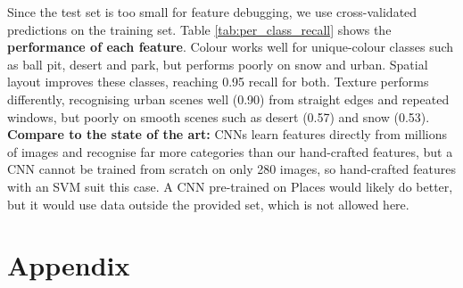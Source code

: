 \documentclass[12pt]{article}
\begin{document}
\noindent
Since the test set is too small for feature debugging, we use cross-validated predictions on the training set. Table \ref{tab:per_class_recall} shows the \textbf{performance of each feature}. Colour works well for unique-colour classes such as ball pit, desert and park, but performs poorly on snow and urban. Spatial layout improves these classes, reaching 0.95 recall for both. Texture performs differently, recognising urban scenes well (0.90) from straight edges and repeated windows, but poorly on smooth scenes such as desert (0.57) and snow (0.53).\\
\textbf{Compare to the state of the art:} CNNs learn features directly from millions of images \cite{zhou2018places} and recognise far more categories than our hand-crafted features, but a CNN cannot be trained from scratch on only 280 images, so hand-crafted features with an SVM suit this case. A CNN pre-trained on Places would likely do better, but it would use data outside the provided set, which is not allowed here.


\newpage


\newpage
\section*{Appendix}
\end{document}
